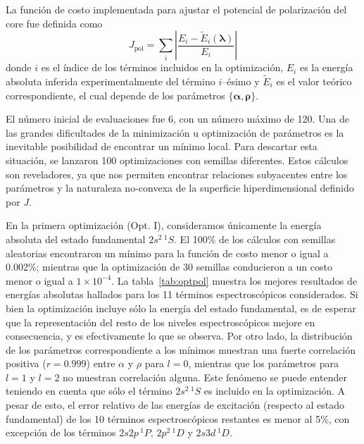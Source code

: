 La función de costo implementada para ajustar el potencial de 
polarización del core fue definida como
\begin{equation}
J_{\mathrm{pol}} = \sum_{i} \left|\frac{E_{i}-\tilde{E}_{i}
(\boldsymbol{\lambda})}{E_{i}} \right|
\label{eq:Jpol}
\end{equation}
donde $i$ es el índice de los términos incluidos en la optimización, 
$E_{i}$ es la energía absoluta inferida experimentalmente del 
término $i$--ésimo y $\tilde{E}_{i}$ es el valor teórico correspondiente, 
el cual depende de los parámetros $\{\boldsymbol\alpha,\boldsymbol\rho\}$.

El número inicial de evaluaciones fue 6, con un número máximo de 120. Una 
de las grandes dificultades de la minimización u optimización de 
parámetros es la inevitable posibilidad de encontrar un mínimo local. 
Para descartar esta situación, se lanzaron 100 optimizaciones con 
semillas diferentes. Estos cálculos son reveladores, ya que nos permiten 
encontrar relaciones subyacentes entre los parámetros y la naturaleza 
no-convexa de la superficie hiperdimensional definido por $J$.

En la primera optimización (Opt. I), consideramos únicamente la energía
absoluta del estado fundamental $2s^2\,^1S$. El 100\% de los cálculos con
semillas aleatorias encontraron un mínimo para la función de costo menor 
o igual a 0.002\%; mientras que la optimización de 30 semillas 
conducieron a un costo menor o igual a $1\times 10^{-4}$. La 
tabla~\ref{tab:optpol} muestra los mejores resultados de energías 
absolutas hallados para los 11 términos espectroscópicos considerados. 
Si bien la optimización incluye sólo la energía del estado fundamental, 
es de esperar que la representación del resto de los niveles 
espectroscópicos mejore en consecuencia, y es efectivamente lo que se 
observa. Por otro lado, la distribución de los parámetros correspondiente 
a los mínimos muestran una fuerte correlación positiva ($r=0.999$) entre 
$\alpha$ y $\rho$ para $l=0$, mientras que los parámetros para $l=1$ y 
$l=2$ no muestran correlación alguna. Este fenómeno se puede entender 
teniendo en cuenta que sólo el término $2s^2\,^1S$ es incluido en la 
optimización. A pesar de esto, el error relativo de las energías de 
excitación (respecto al estado fundamental) de los 10 términos 
espectroscópicos restantes es menor al 5\%, con excepción de los 
términos $2s2p\,^1P$, $2p^2\,^1D$ y $2s3d\,^1D$.

